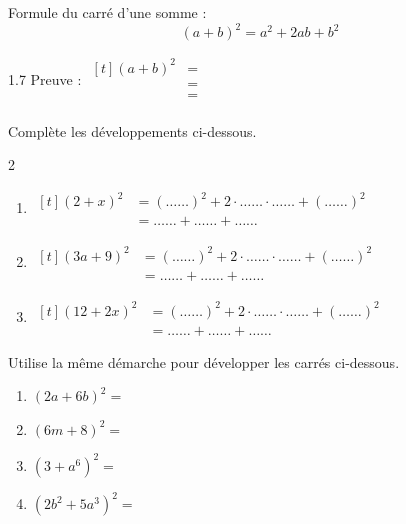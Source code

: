 \documentclass[../math2.tex]{subfiles}
\begin{document}
Formule du carré d'une somme :
\begin{equation*}
  \left(a+b\right)^2=a^2+2ab+b^2
\end{equation*}

\begin{spacing}{1.7}
Preuve : $
  \begin{aligned}[t]
    \left(a+b\right)^2
     & = \\
     & = \\
     & = \\
  \end{aligned}
$
\end{spacing}

\begin{exercise}
  Complète les développements ci-dessous.
  \begin{spacing}{2}
    \begin{enumerate}[itemsep=0.5cm]
      \item $
              \begin{aligned}[t]
                \left(2+x\right)^2 & = \left(\ldots \ldots\right)^2 + 2 \cdot  \ldots \ldots \cdot  \ldots \ldots + \left( \ldots \ldots\right)^2 \\
                                   & =  \ldots \ldots +  \ldots \ldots +  \ldots \ldots
              \end{aligned}
            $
      \item $
              \begin{aligned}[t]
                \left(3a+9\right)^2
                 & = \left( \ldots \ldots\right)^2 + 2 \cdot  \ldots \ldots \cdot  \ldots \ldots + \left( \ldots \ldots\right)^2 \\
                 & =  \ldots \ldots +  \ldots \ldots +  \ldots \ldots
              \end{aligned}
            $
      \item $
              \begin{aligned}[t]
                \left(12+2x\right)^2
                 & = \left( \ldots \ldots\right)^2 + 2 \cdot  \ldots \ldots \cdot  \ldots \ldots + \left( \ldots \ldots\right)^2 \\
                 & =  \ldots \ldots +  \ldots \ldots +  \ldots \ldots
              \end{aligned}
            $
    \end{enumerate}
  \end{spacing}
\end{exercise}

\begin{exercise}
  Utilise la même démarche pour développer les carrés ci-dessous.
  \begin{enumerate}[cols=2, itemsep=2cm]
    \item  $\left(2a+6b\right)^2=$
    \item  $\left(6m+8\right)^2=$
    \item  $\left(3+a^6\right)^2=$
    \item  $\left(2b^2 + 5a^3\right)^2=$
  \end{enumerate}
\end{exercise}
\end{document}
